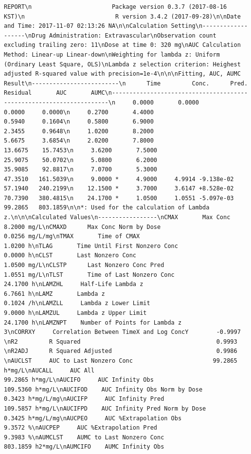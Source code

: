 \documentclass[12pt,]{krantz}
\theoremstyle{definition}
\theoremstyle{definition}
\theoremstyle{definition}
\theoremstyle{remark}
\begin{document}
\begin{verbatim}
REPORT\n                       Package version 0.3.7 (2017-08-16 KST)\n                          R version 3.4.2 (2017-09-28)\n\nDate and Time: 2017-11-07 02:13:26 NA\n\nCalculation Setting\n-------------------\nDrug Administration: Extravascular\nObservation count excluding trailing zero: 11\nDose at time 0: 320 mg\nAUC Calculation Method: Linear-up Linear-down\nWeighting for lambda z: Uniform (Ordinary Least Square, OLS)\nLambda z selection criterion: Heighest adjusted R-squared value with precision=1e-4\n\n\nFitting, AUC, AUMC Result\n-------------------------\n      Time         Conc.      Pred.   Residual       AUC       AUMC\n---------------------------------------------------------------------\n     0.0000       0.0000                           0.0000     0.0000\n     0.2700       4.4000                           0.5940     0.1604\n     0.5800       6.9000                           2.3455     0.9648\n     1.0200       8.2000                           5.6675     3.6854\n     2.0200       7.8000                          13.6675    15.7453\n     3.6200       7.5000                          25.9075    50.0702\n     5.0800       6.2000                          35.9085    92.8817\n     7.0700       5.3000                          47.3510   161.5039\n     9.0000 *     4.9000     4.9914 -9.138e-02    57.1940   240.2199\n    12.1500 *     3.7000     3.6147 +8.528e-02    70.7390   380.4815\n    24.1700 *     1.0500     1.0551 -5.097e-03    99.2865   803.1859\n\n*: Used for the calculation of Lambda z.\n\n\nCalculated Values\n-----------------\nCMAX       Max Conc                                        8.2000 mg/L\nCMAXD      Max Conc Norm by Dose                           0.0256 mg/L/mg\nTMAX       Time of CMAX                                    1.0200 h\nTLAG       Time Until First Nonzero Conc                   0.0000 h\nCLST       Last Nonzero Conc                               1.0500 mg/L\nCLSTP      Last Nonzero Conc Pred                          1.0551 mg/L\nTLST       Time of Last Nonzero Conc                      24.1700 h\nLAMZHL     Half-Life Lambda z                              6.7661 h\nLAMZ       Lambda z                                        0.1024 /h\nLAMZLL     Lambda z Lower Limit                            9.0000 h\nLAMZUL     Lambda z Upper Limit                           24.1700 h\nLAMZNPT    Number of Points for Lambda z                   3\nCORRXY     Correlation Between TimeX and Log ConcY        -0.9997 \nR2         R Squared                                       0.9993 \nR2ADJ      R Squared Adjusted                              0.9986 \nAUCLST     AUC to Last Nonzero Conc                       99.2865 h*mg/L\nAUCALL     AUC All                                        99.2865 h*mg/L\nAUCIFO     AUC Infinity Obs                              109.5360 h*mg/L\nAUCIFOD    AUC Infinity Obs Norm by Dose                   0.3423 h*mg/L/mg\nAUCIFP     AUC Infinity Pred                             109.5857 h*mg/L\nAUCIFPD    AUC Infinity Pred Norm by Dose                  0.3425 h*mg/L/mg\nAUCPEO     AUC %Extrapolation Obs                          9.3572 %\nAUCPEP     AUC %Extrapolation Pred                         9.3983 %\nAUMCLST    AUMC to Last Nonzero Conc                     803.1859 h2*mg/L\nAUMCIFO    AUMC Infinity Obs                    
\end{verbatim}
\end{document}

